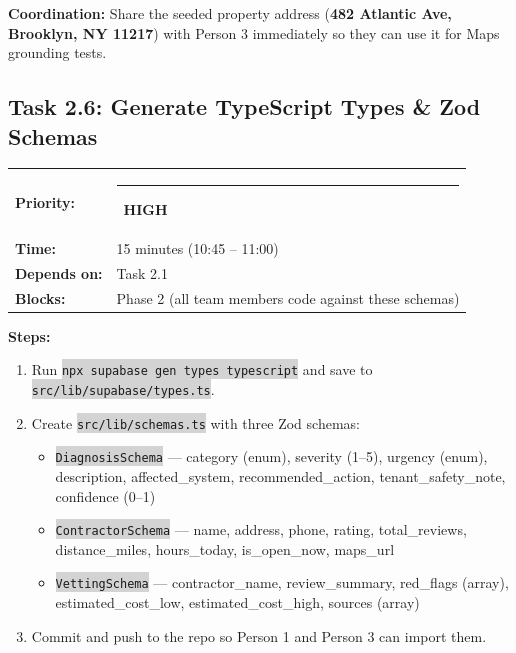 \documentclass[11pt, a4paper]{article}
\newcommand{\highpri}{\textcolor{highamber}{\rule{6pt}{6pt}}~\textcolor{highamber}{\scriptsize\textbf{HIGH}}}
\newcommand{\code}[1]{\texttt{\small\colorbox{lightgray}{#1}}}
\begin{document}
\begin{warningbox}
\textbf{Coordination:} Share the seeded property address (\textbf{482 Atlantic Ave, Brooklyn, NY 11217}) with Person 3 immediately so they can use it for Maps grounding tests.
\end{warningbox}

\vspace{1em}

\subsection{Task 2.6: Generate TypeScript Types \& Zod Schemas}

\begin{tabularx}{\textwidth}{lX}
\textbf{Priority:} & \highpri \\
\textbf{Time:} & 15 minutes (10:45 -- 11:00) \\
\textbf{Depends on:} & Task 2.1 \\
\textbf{Blocks:} & Phase 2 (all team members code against these schemas) \\
\end{tabularx}

\vspace{0.3em}

\textbf{Steps:}
\begin{enumerate}[leftmargin=2em, itemsep=2pt]
  \item Run \code{npx supabase gen types typescript} and save to \code{src/lib/supabase/types.ts}.
  \item Create \code{src/lib/schemas.ts} with three Zod schemas:
    \begin{itemize}[itemsep=1pt]
      \item \code{DiagnosisSchema} --- category (enum), severity (1--5), urgency (enum), description, affected\_system, recommended\_action, tenant\_safety\_note, confidence (0--1)
      \item \code{ContractorSchema} --- name, address, phone, rating, total\_reviews, distance\_miles, hours\_today, is\_open\_now, maps\_url
      \item \code{VettingSchema} --- contractor\_name, review\_summary, red\_flags (array), estimated\_cost\_low, estimated\_cost\_high, sources (array)
    \end{itemize}
  \item Commit and push to the repo so Person 1 and Person 3 can import them.
\end{enumerate}
\end{document}
